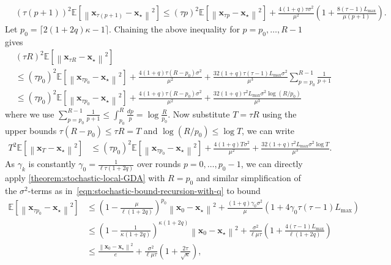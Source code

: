 \documentclass{article}
\newcommand{\vx}{{\mathbf{x}}}
\newcommand{\sqnorm}[1]{\left\| #1 \right\|^2}
\theoremstyle{plain}
\theoremstyle{remark}
\begin{document}
\begin{align*}
    & (\tau(p+1))^2 \mathbb{E} \left[\sqnorm{\vx_{\tau (p+1)} - \vx_\star} \right] \le (\tau p)^2 \mathbb{E} 
    \left[ \sqnorm{\vx_{\tau p} - \vx_\star} \right] + \frac{4(1+q) \tau\sigma^2}{\mu^2} \left( 1 + \frac{8(\tau-1) L_{\mathrm{max}}}{\mu (p+1)} \right) .
\end{align*}
Let $p_0 = \lceil 2(1+2q) \kappa - 1 \rceil$.
Chaining the above inequality for $p = p_0, \dots, R-1$ gives
\begin{align*}
    & (\tau R)^2 \mathbb{E} 
    \left[ \sqnorm{\vx_{\tau R} - \vx_\star} \right] \\
    & \le (\tau p_0)^2 \mathbb{E} 
    \left[ \sqnorm{\vx_{\tau p_0} - \vx_\star} \right] + \frac{4(1+q) \tau (R - p_0) \sigma^2}{\mu^2} + \frac{32(1+q) \tau(\tau-1) L_{\mathrm{max}} \sigma^2}{\mu^3} \sum_{p=p_0}^{R-1} \frac{1}{p+1} \\
    & \le (\tau p_0)^2 \mathbb{E} 
    \left[ \sqnorm{\vx_{\tau p_0} - \vx_\star} \right] + \frac{4(1+q) \tau (R - p_0) \sigma^2}{\mu^2} + 
    \frac{32(1+q) \tau^2 L_{\mathrm{max}} \sigma^2 \log (R/p_0)}{\mu^3}
\end{align*}
where we use $\sum_{p=p_0}^{R-1} \frac{1}{p+1} \le \int_{p_0}^R \frac{dp}{p} = \log \frac{R}{p_0}$.
Now substitute $T = \tau R$ using the upper bounds $\tau(R - p_0) \le \tau R = T$ and $\log (R/p_0) \le \log T$, we can write
\begin{align}
\label{eqn:diminishing-stepsize-bound-with-p0}
    T^2 \mathbb{E} 
    \left[ \sqnorm{\vx_{T} - \vx_\star} \right] & \le (\tau p_0)^2 \mathbb{E} 
    \left[ \sqnorm{\vx_{\tau p_0} - \vx_\star} \right] + \frac{4(1+q)T\sigma^2}{\mu^2} + \frac{32(1+q) \tau^2 L_{\mathrm{max}} \sigma^2 \log T}{\mu^3} .
\end{align}
As $\gamma_k$ is constantly $\gamma_0 = \frac{1}{\ell\tau (1+2q)}$ over rounds $p=0,\dots,p_0-1$, we can directly apply \cref{theorem:stochastic-local-GDA} with $R=p_0$ and similar simplification of the $\sigma^2$-terms as in~\eqref{eqn:stochastic-bound-recursion-with-q} to bound
\begin{align*}
    \mathbb{E} 
    \left[ \sqnorm{\vx_{\tau p_0} - \vx_\star} \right] & \le \left( 1-\frac{\mu}{\ell(1+2q)} \right)^{p_0} \sqnorm{\vx_0 - \vx_\star} + \frac{(1+q) \gamma_0 \sigma^2}{\mu} \left( 1 + 4\gamma_0\tau(\tau-1) L_{\mathrm{max}} \right) \\
    & \le \left( 1-\frac{1}{\kappa(1+2q)} \right)^{\kappa(1+2q)} \sqnorm{\vx_0 - \vx_\star} + \frac{\sigma^2}{\ell\mu\tau} \left( 1 + \frac{4(\tau-1) L_{\mathrm{max}}}{\ell(1+2q)} \right) \\
    & \le \frac{\sqnorm{\vx_0 - \vx_\star}}{e} + \frac{\sigma^2}{\ell\mu\tau} \left( 1 + \frac{2\tau}{\sqrt{\kappa}} \right) ,
\end{align*}
\end{document}
